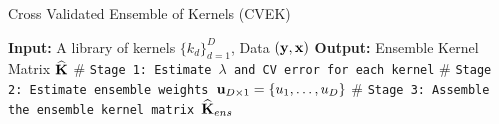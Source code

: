 \documentclass[article]{jss}
\begin{document}
\newpage
\begin{algorithm}
\caption{Cross Validated Ensemble of Kernels (CVEK)} 
\label{alg:cvke}
\begin{algorithmic}[1]
\newline
\textbf{Input:} A library of kernels $\{k_d\}_{d=1}^D$, Data $({\bf y}, {\bf x})$\newline
\textbf{Output:} Ensemble Kernel Matrix $\widehat{{\bf K}}$\newline
$\#$ \texttt{Stage 1: Estimate $\lambda$ and CV error for each kernel}
\EndFor 
\newline
$\#$ \texttt{Stage 2: Estimate ensemble weights ${\bf u}_{D \times 1} = \{u_1, \dots, u_D\}$}
\newline
$\#$ \texttt{Stage 3: Assemble the ensemble kernel matrix $\widehat{{\bf K}}_{ens}$}
\EndProcedure
\end{algorithmic}
\end{algorithm}
\end{document}
